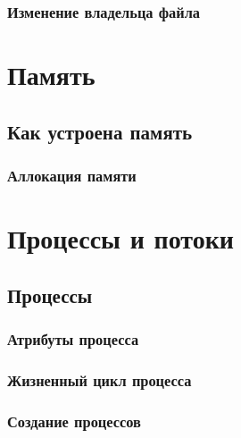 \documentclass[oneside]{book}
\begin{document}
      \section{Изменение владельца файла}
      



\clearpage \part{Память}

   \chapter{Как устроена память}
   

      \section{Аллокация памяти}
      


\clearpage \part{Процессы и потоки}

   \chapter{Процессы}
   

      \section{Атрибуты процесса}
      

      \section{Жизненный цикл процесса}
      

      \section{Создание процессов}
\end{document}
